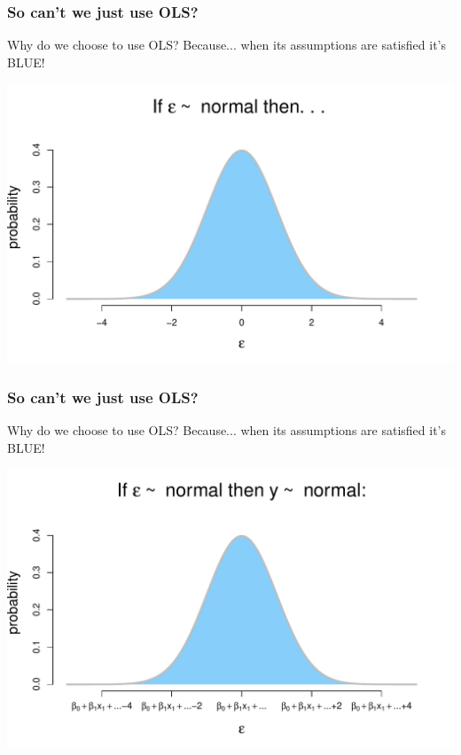 \documentclass[aspectratio=169]{beamer}
\begin{document}
\begin{frame}
\frametitle{So can't we just use OLS?}
Why do we choose to use OLS?  Because...  when its assumptions are satisfied it's BLUE!
\begin{center}
\includegraphics[scale=0.55]{normal_distribution.pdf}
\end{center}
\end{frame}

\begin{frame}
\frametitle{So can't we just use OLS?}
Why do we choose to use OLS?  Because...  when its assumptions are satisfied it's BLUE!
\begin{center}
\includegraphics[scale=0.55]{normal_distribution_y.pdf}
\end{center}
\end{frame}
\end{document}
